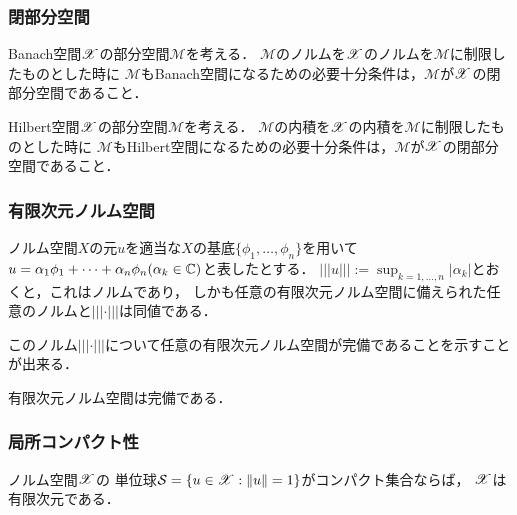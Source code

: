     \subsubsection{閉部分空間}
    \begin{Them}[定理1.28, p17] \label{them1:28}
        Banach空間$\mathscr{X}$の部分空間$\mathscr{M}$を考える．
        $\mathscr{M}$のノルムを$\mathscr{X}$のノルムを$\mathscr{M}$に制限したものとした時に
        $\mathscr{M}$もBanach空間になるための必要十分条件は，$\mathscr{M}$が$\mathscr{X}$の閉部分空間であること．
    \end{Them}
    \begin{Cor}[系1.29, p.18] \label{cor1:29}
        Hilbert空間$\mathscr{X}$の部分空間$\mathscr{M}$を考える．
        $\mathscr{M}$の内積を$\mathscr{X}$の内積を$\mathscr{M}$に制限したものとした時に
        $\mathscr{M}$もHilbert空間になるための必要十分条件は，$\mathscr{M}$が$\mathscr{X}$の閉部分空間であること．
    \end{Cor}

    \subsubsection{有限次元ノルム空間}
    \begin{Them}[補題1.38, p.22] \label{them1:38}
        ノルム空間$X$の元$u$を適当な$X$の基底$\{ \phi_1, \dots, \phi_n \}$を用いて
        $u=\alpha_1 \phi_1+\dots+\alpha_n \phi_n (\alpha_k \in \mathbb{C})$と表したとする．
        $||| u |||:=\sup_{k=1,\dots,n}{|\alpha_k|}$とおくと，これはノルムであり，
        しかも任意の有限次元ノルム空間に備えられた任意のノルムと$||| \cdot |||$は同値である．
    \end{Them}
    このノルム$||| \cdot |||$について任意の有限次元ノルム空間が完備であることを示すことが出来る．
    \begin{Them}[定理1.37, p.22] \label{them1:37}
        有限次元ノルム空間は完備である．
    \end{Them}

    \subsubsection{局所コンパクト性}
    \begin{Them}
        ノルム空間$\mathscr{X}$の
        単位球$\mathcal{S}=\{u \in \mathscr{X} : \|u\|=1\}$がコンパクト集合ならば，
        $\mathscr{X}$は有限次元である．
    \end{Them}

